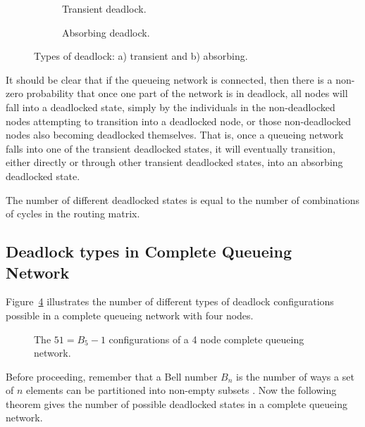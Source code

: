 \documentclass{article}
\begin{document}
\begin{figure}[!htbp]
\begin{center}
\begin{subfigure}[b]{0.45\textwidth}
  
  \caption{Transient deadlock.}
  \label{fig:trans}
\end{subfigure}
\begin{subfigure}[b]{0.45\textwidth}
  
  \caption{Absorbing deadlock.}
  \label{fig:absorb}
\end{subfigure}
\caption{Types of deadlock: a) transient and b) absorbing.}
\label{fig:transabsorb}
\end{center}
\end{figure}

It should be clear that if the queueing network is connected, then there is a non-zero probability that once one part of the network is in deadlock, all nodes will fall into a deadlocked state, simply by the individuals in the non-deadlocked nodes attempting to transition into a deadlocked node, or those non-deadlocked nodes also becoming deadlocked themselves.
That is, once a queueing network falls into one of the transient deadlocked states, it will eventually transition, either directly or through other transient deadlocked states, into an absorbing deadlocked state.

The number of different deadlocked states is equal to the number of combinations of cycles in the routing matrix.

\subsection{Deadlock types in Complete Queueing Network}

Figure~\ref{fig:4nodecombinations} illustrates the number of different types of deadlock configurations possible in a complete queueing network with four nodes.

\begin{figure}[!htbp]
  \begin{center}
    
  \end{center}
  \caption{The $51 = B_5-1$ configurations of a 4 node complete queueing network.}
  \label{fig:4nodecombinations}
\end{figure}

Before proceeding, remember that a Bell number $B_n$ is the number of ways a set of $n$ elements can be partitioned into non-empty subsets \cite{cameron94}.
Now the following theorem gives the number of possible deadlocked states in a complete queueing network.\\
\end{document}
